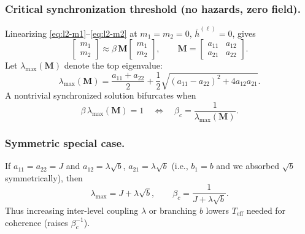 \documentclass[a4paper,11pt]{article}
\begin{document}
\subsubsection{Critical synchronization threshold (no hazards, zero field).}
Linearizing \eqref{eq:l2-m1}–\eqref{eq:l2-m2} at $m_1{=}m_2{=}0$, $\bar h^{(\ell)}{=}0$, gives
\begin{equation}
\begin{bmatrix} m_1 \\[2pt] m_2 \end{bmatrix}
\approx
\beta\,\mathbf{M}
\begin{bmatrix} m_1 \\[2pt] m_2 \end{bmatrix},
\qquad
\mathbf{M}=\begin{bmatrix} a_{11} & a_{12} \\ a_{21} & a_{22} \end{bmatrix}.
\end{equation}
Let $\lambda_{\max}(\mathbf{M})$ denote the top eigenvalue:
\begin{equation}
\lambda_{\max}(\mathbf{M})=\frac{a_{11}+a_{22}}{2}+\frac{1}{2}\sqrt{(a_{11}-a_{22})^2+4 a_{12}a_{21}}.
\end{equation}
A nontrivial synchronized solution bifurcates when
\begin{equation}
\label{eq:l2-critical}
\beta\,\lambda_{\max}(\mathbf{M})=1
\quad\Longleftrightarrow\quad
\beta_c=\frac{1}{\lambda_{\max}(\mathbf{M})}.
\end{equation}

\subsubsection{Symmetric special case.}
If $a_{11}{=}a_{22}{=}J$ and $a_{12}{=}\lambda\sqrt{b}$, $a_{21}{=}\lambda\sqrt{b}$ (i.e., $b_1{=}b$ and we absorbed $\sqrt{b}$ symmetrically), then
\begin{equation}
\lambda_{\max}=J+\lambda\sqrt{b},\qquad
\beta_c=\frac{1}{J+\lambda\sqrt{b}}.
\end{equation}
Thus increasing inter-level coupling $\lambda$ or branching $b$ lowers $T_{\mathrm{eff}}$ needed for coherence (raises $\beta_c^{-1}$).
\end{document}
